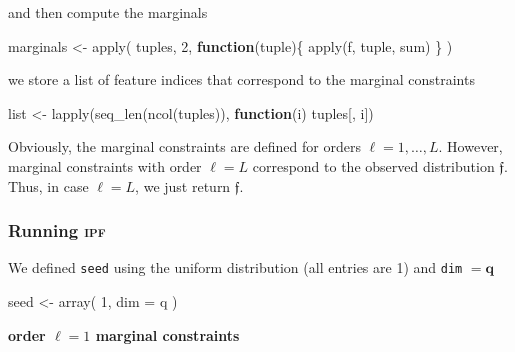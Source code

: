 \documentclass[
]{article}
\newenvironment{Shaded}{\begin{snugshade}}{\end{snugshade}}
\newcommand{\AttributeTok}[1]{\textcolor[rgb]{0.77,0.63,0.00}{#1}}
\newcommand{\ConstantTok}[1]{\textcolor[rgb]{0.00,0.00,0.00}{#1}}
\newcommand{\ControlFlowTok}[1]{\textcolor[rgb]{0.13,0.29,0.53}{\textbf{#1}}}
\newcommand{\DecValTok}[1]{\textcolor[rgb]{0.00,0.00,0.81}{#1}}
\newcommand{\DocumentationTok}[1]{\textcolor[rgb]{0.56,0.35,0.01}{\textbf{\textit{#1}}}}
\newcommand{\FunctionTok}[1]{\textcolor[rgb]{0.00,0.00,0.00}{#1}}
\newcommand{\NormalTok}[1]{#1}
\newcommand{\OtherTok}[1]{\textcolor[rgb]{0.56,0.35,0.01}{#1}}
\newcommand{\SpecialCharTok}[1]{\textcolor[rgb]{0.00,0.00,0.00}{#1}}
\newcommand{\prob}[1]{\mathfrak{#1}}
\newcommand{\ipf}{\textsc{ipf}~}
\begin{document}
and then compute the marginals

\begin{Shaded}
\begin{Highlighting}[]
\NormalTok{marginals }\OtherTok{\textless{}{-}} \FunctionTok{apply}\NormalTok{(}
\NormalTok{  tuples, }\DecValTok{2}\NormalTok{,}
  \ControlFlowTok{function}\NormalTok{(tuple)\{}
    \FunctionTok{apply}\NormalTok{(f, tuple, sum)}
\NormalTok{  \}}
\NormalTok{)}
\end{Highlighting}
\end{Shaded}

we store a list of feature indices that correspond to the marginal
constraints

\begin{Shaded}
\begin{Highlighting}[]
\NormalTok{list }\OtherTok{\textless{}{-}} \FunctionTok{lapply}\NormalTok{(}\FunctionTok{seq\_len}\NormalTok{(}\FunctionTok{ncol}\NormalTok{(tuples)), }\ControlFlowTok{function}\NormalTok{(i) tuples[, i])}
\end{Highlighting}
\end{Shaded}

Obviously, the marginal constraints are defined for orders
\(\ell = 1, \ldots, L\). However, marginal constraints with order
\(\ell = L\) correspond to the observed distribution \(\prob f\). Thus,
in case \(\ell = L\), we just return \(\prob f\).

\hypertarget{running}{%
\subsubsection{\texorpdfstring{Running \ipf}{Running }}\label{running}}

We defined \texttt{seed} using the uniform distribution (all entries are
1) and \texttt{dim} \(=\mathbf q\)

\begin{Shaded}
\begin{Highlighting}[]
\NormalTok{seed }\OtherTok{\textless{}{-}} \FunctionTok{array}\NormalTok{(}
  \DecValTok{1}\NormalTok{,}
  \AttributeTok{dim =}\NormalTok{ q}
\NormalTok{)}
\end{Highlighting}
\end{Shaded}

\textbf{order \(\ell = 1\) marginal constraints}

\begin{Shaded}
\end{Shaded}
\end{document}
